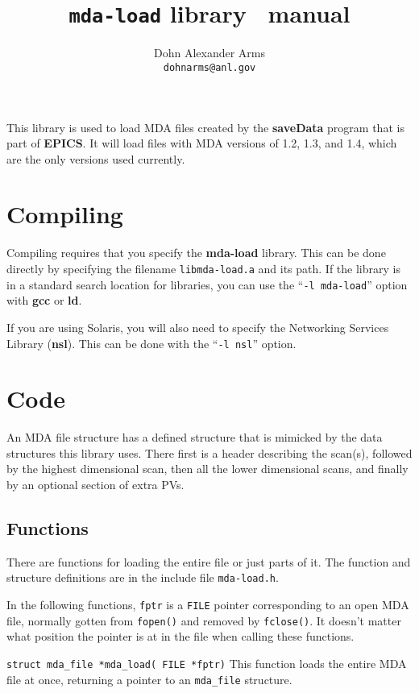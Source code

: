 \documentclass[10pt,letterpaper]{article}
\title{ \vspace{-5ex} \texttt{mda-load} library \version\ manual}
\author{Dohn Alexander Arms \\ \texttt{dohnarms@anl.gov}}
\begin{document}
\maketitle


This library is used to load MDA files created by the
\textbf{saveData} program that is part of \textbf{EPICS}.
It will load files with MDA versions of 1.2, 1.3, and 1.4,
which are the only versions used currently.


\section{Compiling}

Compiling requires that you specify the \textbf{mda-load} library.
This can be done directly by specifying the filename
\verb+libmda-load.a+ and its path. If the library is in a standard
search location for libraries, you can use the ``\verb+-l mda-load+''
option with \textbf{gcc} or \textbf{ld}.

If you are using Solaris, you will also need to specify the Networking
Services Library (\textbf{nsl}).  This can be done with the
``\verb+-l nsl+'' option.


\section{Code}

An MDA file structure has a defined structure that is mimicked by the
data structures this library uses.  There first is a header describing
the scan(s), followed by the highest dimensional scan, then all the
lower dimensional scans, and finally by an optional section of extra
PVs.


\subsection{Functions}

There are functions for loading the entire file or just parts of it.
The function and structure definitions are in the include file
\verb+mda-load.h+.

In the following functions, \verb+fptr+ is a \verb+FILE+ pointer
corresponding to an open MDA file, normally gotten from \verb+fopen()+
and removed by \verb+fclose()+.  It doesn't matter what position the
pointer is at in the file when calling these functions.

\vspace{1.5ex}
\noindent
\verb+struct mda_file *mda_load( FILE *fptr)+ \linebreak
This function loads the entire MDA file at once, returning a pointer
to an \verb+mda_file+ structure.
\end{document}

